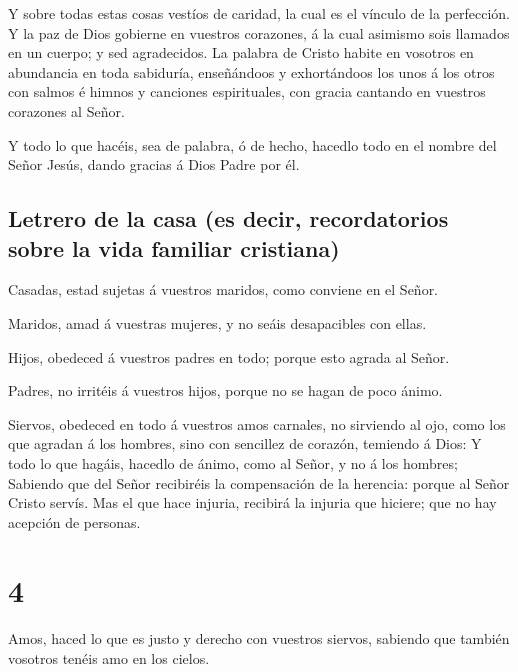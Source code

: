  Y sobre todas estas cosas vestíos de caridad, la cual es
el vínculo de la perfección.  Y la paz de Dios gobierne
en vuestros corazones, á la cual asimismo sois llamados en un cuerpo; y
sed agradecidos.  La palabra de Cristo habite en vosotros
en abundancia en toda sabiduría, enseñándoos y exhortándoos los unos á
los otros con salmos é himnos y canciones espirituales, con gracia
cantando en vuestros corazones al Señor.

 Y todo lo que hacéis, sea de palabra, ó de hecho,
hacedlo todo en el nombre del Señor Jesús, dando gracias á Dios Padre
por él.

\hypertarget{letrero-de-la-casa-es-decir-recordatorios-sobre-la-vida-familiar-cristiana}{%
\subsection{Letrero de la casa (es decir, recordatorios sobre la vida
familiar
cristiana)}\label{letrero-de-la-casa-es-decir-recordatorios-sobre-la-vida-familiar-cristiana}}

 Casadas, estad sujetas á vuestros maridos, como conviene
en el Señor.

 Maridos, amad á vuestras mujeres, y no seáis
desapacibles con ellas.

 Hijos, obedeced á vuestros padres en todo; porque esto
agrada al Señor.

 Padres, no irritéis á vuestros hijos, porque no se hagan
de poco ánimo.

 Siervos, obedeced en todo á vuestros amos carnales, no
sirviendo al ojo, como los que agradan á los hombres, sino con sencillez
de corazón, temiendo á Dios:  Y todo lo que hagáis,
hacedlo de ánimo, como al Señor, y no á los hombres; 
Sabiendo que del Señor recibiréis la compensación de la herencia: porque
al Señor Cristo servís.  Mas el que hace injuria,
recibirá la injuria que hiciere; que no hay acepción de personas.

\hypertarget{section-51-4}{%
\section{4}\label{section-51-4}}

 Amos, haced lo que es justo y derecho con vuestros
siervos, sabiendo que también vosotros tenéis amo en los cielos.

